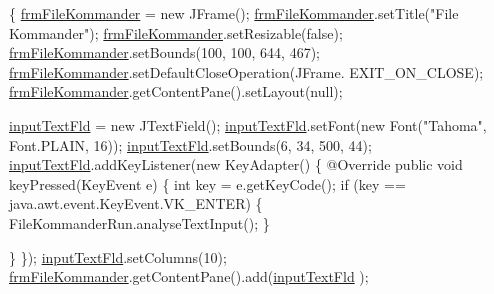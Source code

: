 \begin{DoxyCode}
                              \{
        \hyperlink{classcom_1_1poly_1_1nlp_1_1filekommander_1_1views_1_1_file_kommander_g_u_i_v2_a98fff3b4c6caac91d624b07beab03af5}{frmFileKommander} = \textcolor{keyword}{new} JFrame();
        \hyperlink{classcom_1_1poly_1_1nlp_1_1filekommander_1_1views_1_1_file_kommander_g_u_i_v2_a98fff3b4c6caac91d624b07beab03af5}{frmFileKommander}.setTitle(\textcolor{stringliteral}{"File Kommander"});
        \hyperlink{classcom_1_1poly_1_1nlp_1_1filekommander_1_1views_1_1_file_kommander_g_u_i_v2_a98fff3b4c6caac91d624b07beab03af5}{frmFileKommander}.setResizable(\textcolor{keyword}{false});
        \hyperlink{classcom_1_1poly_1_1nlp_1_1filekommander_1_1views_1_1_file_kommander_g_u_i_v2_a98fff3b4c6caac91d624b07beab03af5}{frmFileKommander}.setBounds(100, 100, 644, 467);
        \hyperlink{classcom_1_1poly_1_1nlp_1_1filekommander_1_1views_1_1_file_kommander_g_u_i_v2_a98fff3b4c6caac91d624b07beab03af5}{frmFileKommander}.setDefaultCloseOperation(JFrame.
      EXIT\_ON\_CLOSE);
        \hyperlink{classcom_1_1poly_1_1nlp_1_1filekommander_1_1views_1_1_file_kommander_g_u_i_v2_a98fff3b4c6caac91d624b07beab03af5}{frmFileKommander}.getContentPane().setLayout(null);

        \hyperlink{classcom_1_1poly_1_1nlp_1_1filekommander_1_1views_1_1_file_kommander_g_u_i_v2_a43db9456e6f586e8a7d59c86dc90cdc8}{inputTextFld} = \textcolor{keyword}{new} JTextField();
        \hyperlink{classcom_1_1poly_1_1nlp_1_1filekommander_1_1views_1_1_file_kommander_g_u_i_v2_a43db9456e6f586e8a7d59c86dc90cdc8}{inputTextFld}.setFont(\textcolor{keyword}{new} Font(\textcolor{stringliteral}{"Tahoma"}, Font.PLAIN, 16));
        \hyperlink{classcom_1_1poly_1_1nlp_1_1filekommander_1_1views_1_1_file_kommander_g_u_i_v2_a43db9456e6f586e8a7d59c86dc90cdc8}{inputTextFld}.setBounds(6, 34, 500, 44);
        \hyperlink{classcom_1_1poly_1_1nlp_1_1filekommander_1_1views_1_1_file_kommander_g_u_i_v2_a43db9456e6f586e8a7d59c86dc90cdc8}{inputTextFld}.addKeyListener(\textcolor{keyword}{new} KeyAdapter() \{
            @Override
            \textcolor{keyword}{public} \textcolor{keywordtype}{void} keyPressed(KeyEvent e) \{
                \textcolor{keywordtype}{int} key = e.getKeyCode();
                \textcolor{keywordflow}{if} (key == java.awt.event.KeyEvent.VK\_ENTER) \{
                    FileKommanderRun.analyseTextInput();
                \}

            \}
        \});
        \hyperlink{classcom_1_1poly_1_1nlp_1_1filekommander_1_1views_1_1_file_kommander_g_u_i_v2_a43db9456e6f586e8a7d59c86dc90cdc8}{inputTextFld}.setColumns(10);
        \hyperlink{classcom_1_1poly_1_1nlp_1_1filekommander_1_1views_1_1_file_kommander_g_u_i_v2_a98fff3b4c6caac91d624b07beab03af5}{frmFileKommander}.getContentPane().add(\hyperlink{classcom_1_1poly_1_1nlp_1_1filekommander_1_1views_1_1_file_kommander_g_u_i_v2_a43db9456e6f586e8a7d59c86dc90cdc8}{inputTextFld}
      );


\end{DoxyCode}
